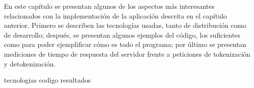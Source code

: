 %
%
%

%
%
En este capítulo se presentan algunos de los aspectos más interesantes
relacionados con la implementación de la aplicación descrita en el capítulo
anterior. Primero se describen las tecnologías usadas, tanto de distribución
como de desarrollo; después, se presentan algunos ejemplos del código, los
suficientes como para poder ejemplificar cómo es todo el programa; por último
se presentan mediciones de tiempo de respuesta del servidor frente a peticiones
de tokenización y detokenización.

{tecnologias}
{codigo}
{resultados}
